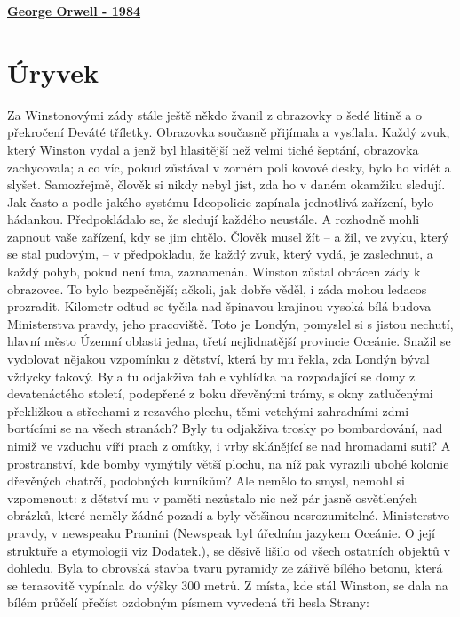 \documentclass[11pt]{article}
\begin{document}
    \begin{center}
        \underline{\textbf{\Huge George Orwell - 1984}}
    \end{center}
    \section*{Úryvek}
    Za Winstonovými zády stále ještě někdo žvanil z obrazovky o šedé litině a o překročení Deváté tříletky. Obrazovka současně přijímala a vysílala. Každý zvuk, který Winston vydal a jenž byl hlasitější než velmi tiché šeptání, obrazovka zachycovala; a co víc, pokud zůstával v zorném poli kovové desky, bylo ho vidět a slyšet. Samozřejmě, člověk si nikdy nebyl jist, zda ho v daném okamžiku sledují. Jak často a podle jakého systému Ideopolicie zapínala jednotlivá zařízení, bylo hádankou. Předpokládalo se, že sledují každého neustále. A rozhodně mohli zapnout vaše zařízení, kdy se jim chtělo. Člověk musel žít – a žil, ve zvyku, který se stal pudovým, – v předpokladu, že každý zvuk, který vydá, je zaslechnut, a každý pohyb, pokud není tma, zaznamenán.
Winston zůstal obrácen zády k obrazovce. To bylo bezpečnější; ačkoli, jak dobře věděl, i záda mohou ledacos prozradit. Kilometr odtud se tyčila nad špinavou krajinou vysoká bílá budova Ministerstva pravdy, jeho pracoviště. Toto je Londýn, pomyslel si s jistou nechutí, hlavní město Územní oblasti jedna, třetí nejlidnatější provincie Oceánie. Snažil se vydolovat nějakou vzpomínku z dětství, která by mu řekla, zda Londýn býval vždycky takový. Byla tu odjakživa tahle vyhlídka na rozpadající se domy z devatenáctého století, podepřené z boku dřevěnými trámy, s okny zatlučenými překližkou a střechami z rezavého plechu, těmi vetchými zahradními zdmi bortícími se na všech stranách? Byly tu odjakživa trosky po bombardování, nad nimiž ve vzduchu víří prach z omítky, i vrby sklánějící se nad hromadami suti? A prostranství, kde bomby vymýtily větší plochu, na níž pak vyrazili ubohé kolonie dřevěných chatrčí, podobných kurníkům? Ale nemělo to smysl, nemohl si vzpomenout: z dětství mu v paměti nezůstalo nic než pár jasně osvětlených obrázků, které neměly žádné pozadí a byly většinou nesrozumitelné.
Ministerstvo pravdy, v newspeaku Pramini (Newspeak byl úředním jazykem Oceánie. O její struktuře a etymologii viz Dodatek.), se děsivě lišilo od všech ostatních objektů v dohledu. Byla to obrovská stavba tvaru pyramidy ze zářivě bílého betonu, která se terasovitě vypínala do výšky 300 metrů. Z místa, kde stál Winston, se dala na bílém průčelí přečíst ozdobným písmem vyvedená tři hesla Strany:
\end{document}
